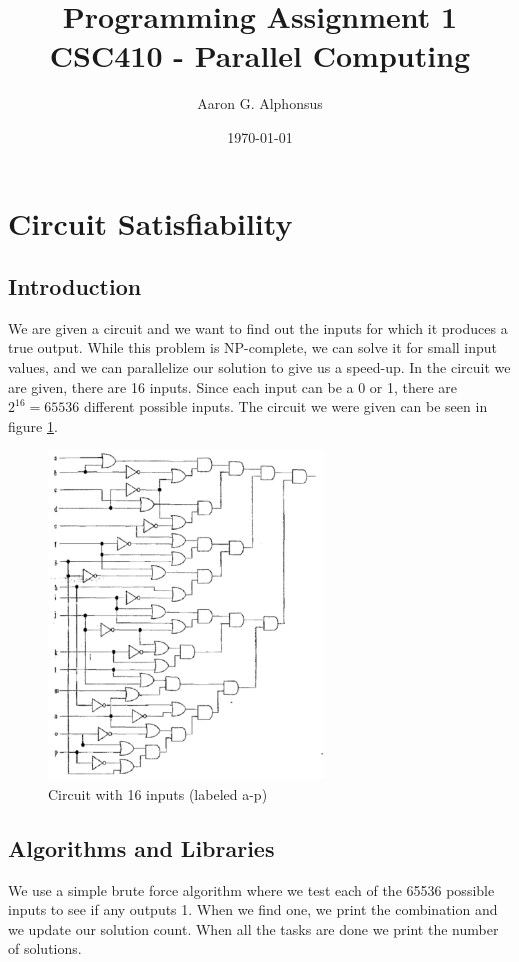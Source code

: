 \documentclass{article}
\title{Programming Assignment 1\\ CSC410 - Parallel Computing}
\author{Aaron G. Alphonsus}
\date{\today}
\begin{document}
\maketitle

\section{Circuit Satisfiability}

\subsection{Introduction}
We are given a circuit and we want to find out the inputs for which it produces 
a true output. While this problem is NP-complete, we can solve it for small 
input values, and we can parallelize our solution to give us a speed-up. In the 
circuit we are given, there are 16 inputs. Since each input can be a 0 or 1, 
there are $2^{16} = 65536$ different possible inputs. The circuit we were given 
can be seen in figure \ref{fig:circuit}.

\begin{figure}[h]
    \centering
    \includegraphics[width=0.65\textwidth]{circuit.png}
    \caption{Circuit with 16 inputs (labeled a-p)}
    \label{fig:circuit}
\end{figure}

\subsection{Algorithms and Libraries}
We use a simple brute force algorithm where we test each of the 65536 possible inputs to see if any outputs 1. When we find one, we print the combination and we update our solution count. When all the tasks are done we print the number of solutions. 
\end{document}
